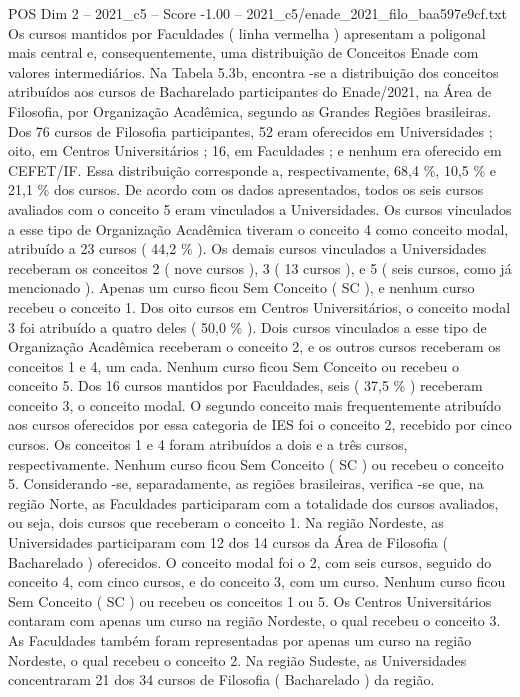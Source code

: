 \begin{textsample}{POS Dim 2 – 2021\_c5 – Score -1.00 – 2021\_c5/enade\_2021\_filo\_baa597e9cf.txt}
Os cursos mantidos por Faculdades ( linha vermelha ) apresentam a poligonal mais central e, consequentemente, uma distribuição de Conceitos Enade com valores intermediários.
Na Tabela 5.3b, encontra -se a distribuição dos conceitos atribuídos aos cursos de Bacharelado participantes do Enade/2021, na Área de Filosofia, por Organização Acadêmica, segundo as Grandes Regiões brasileiras.
Dos 76 cursos de Filosofia participantes, 52 eram oferecidos em Universidades ; oito, em Centros Universitários ; 16, em Faculdades ; e nenhum era oferecido em CEFET/IF.
Essa distribuição corresponde a, respectivamente, 68,4 \%, 10,5 \% e 21,1 \% dos cursos.
De acordo com os dados apresentados, todos os seis cursos avaliados com o conceito 5 eram vinculados a Universidades.
Os cursos vinculados a esse tipo de Organização Acadêmica tiveram o conceito 4 como conceito modal, atribuído a 23 cursos ( 44,2 \% ).
Os demais cursos vinculados a Universidades receberam os conceitos 2 ( nove cursos ), 3 ( 13 cursos ), e 5 ( seis cursos, como já mencionado ).
Apenas um curso ficou Sem Conceito ( SC ), e nenhum curso recebeu o conceito 1.
Dos oito cursos em Centros Universitários, o conceito modal 3 foi atribuído a quatro deles ( 50,0 \% ).
Dois cursos vinculados a esse tipo de Organização Acadêmica receberam o conceito 2, e os outros cursos receberam os conceitos 1 e 4, um cada.
Nenhum curso ficou Sem Conceito ou recebeu o conceito 5.
Dos 16 cursos mantidos por Faculdades, seis ( 37,5 \% ) receberam conceito 3, o conceito modal.
O segundo conceito mais frequentemente atribuído aos cursos oferecidos por essa categoria de IES foi o conceito 2, recebido por cinco cursos.
Os conceitos 1 e 4 foram atribuídos a dois e a três cursos, respectivamente.
Nenhum curso ficou Sem Conceito ( SC ) ou recebeu o conceito 5.
Considerando -se, separadamente, as regiões brasileiras, verifica -se que, na região Norte, as Faculdades participaram com a totalidade dos cursos avaliados, ou seja, dois cursos que receberam o conceito 1.
Na região Nordeste, as Universidades participaram com 12 dos 14 cursos da Área de Filosofia ( Bacharelado ) oferecidos.
O conceito modal foi o 2, com seis cursos, seguido do conceito 4, com cinco cursos, e do conceito 3, com um curso.
Nenhum curso ficou Sem Conceito ( SC ) ou recebeu os conceitos 1 ou 5.
Os Centros Universitários contaram com apenas um curso na região Nordeste, o qual recebeu o conceito 3.
As Faculdades também foram representadas por apenas um curso na região Nordeste, o qual recebeu o conceito 2.
Na região Sudeste, as Universidades concentraram 21 dos 34 cursos de Filosofia ( Bacharelado ) da região.

\end{textsample}

